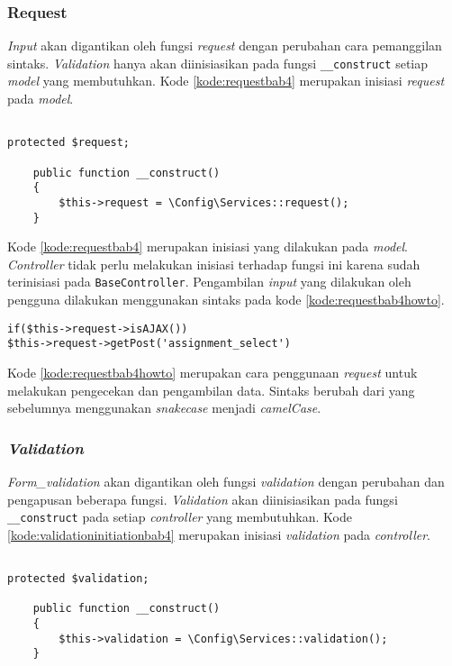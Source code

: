 \subsubsection{Request}
\textit{Input} akan digantikan oleh fungsi \textit{request} dengan perubahan cara pemanggilan sintaks. \textit{Validation} hanya akan diinisiasikan pada fungsi \texttt{\_\_construct} setiap \textit{model} yang membutuhkan. Kode \ref{kode:requestbab4} merupakan inisiasi \textit{request} pada \textit{model}.

\begin{lstlisting}[caption=Perancangan inisiasi \textit{request} pada \texttt{\_\_construct}, label=kode:requestbab4]

protected $request;

	public function __construct()
	{
		$this->request = \Config\Services::request(); 
	}
\end{lstlisting}

Kode \ref{kode:requestbab4} merupakan inisiasi yang dilakukan pada \textit{model}. \textit{Controller} tidak perlu melakukan inisiasi terhadap fungsi ini karena sudah terinisiasi pada \texttt{BaseController}. Pengambilan \textit{input} yang dilakukan oleh pengguna dilakukan menggunakan sintaks pada kode \ref{kode:requestbab4howto}.

\begin{lstlisting}[caption=Perancangan penggunaan \textit{request}, label=kode:requestbab4howto]
if($this->request->isAJAX())
$this->request->getPost('assignment_select')
\end{lstlisting}

Kode \ref{kode:requestbab4howto} merupakan cara penggunaan \textit{request} untuk melakukan pengecekan dan pengambilan data. Sintaks berubah dari yang sebelumnya menggunakan \textit{snakecase} menjadi \textit{camelCase}.

\subsubsection{\textit{Validation}}
\textit{Form\_validation} akan digantikan oleh fungsi \textit{validation} dengan perubahan dan pengapusan beberapa fungsi. \textit{Validation} akan diinisiasikan pada fungsi \texttt{\_\_construct} pada setiap \textit{controller} yang membutuhkan. Kode \ref{kode:validationinitiationbab4} merupakan inisiasi \textit{validation} pada \textit{controller}.

\begin{lstlisting}[caption=Perancangan inisiasi \textit{validation} pada \texttt{\_\_construct}, label=kode:validationinitiationbab4]

protected $validation;

	public function __construct()
	{
		$this->validation = \Config\Services::validation();
	}
\end{lstlisting}

